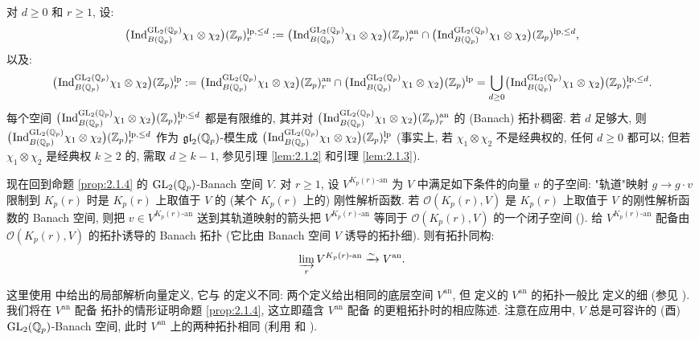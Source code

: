 对 $d \ge 0$ 和 $r \ge 1$, 设:
\[
\bigl(\prescript{}{}{\mathrm{Ind}}_{B(\mathbb{Q}_p)}^{\mathrm{GL}_2(\mathbb{Q}_p)} \chi_1 \otimes \chi_2\bigr)(\mathbb{Z}_p)^{\mathrm{lp},\le d}_{r}
:= \bigl(\prescript{}{}{\mathrm{Ind}}_{B(\mathbb{Q}_p)}^{\mathrm{GL}_2(\mathbb{Q}_p)} \chi_1 \otimes \chi_2\bigr)(\mathbb{Z}_p)^{\mathrm{an}}_{r}
\cap \bigl(\prescript{}{}{\mathrm{Ind}}_{B(\mathbb{Q}_p)}^{\mathrm{GL}_2(\mathbb{Q}_p)} \chi_1 \otimes \chi_2\bigr)(\mathbb{Z}_p)^{\mathrm{lp},\le d},
\]
以及:
\[
\bigl(\prescript{}{}{\mathrm{Ind}}_{B(\mathbb{Q}_p)}^{\mathrm{GL}_2(\mathbb{Q}_p)} \chi_1 \otimes \chi_2\bigr)(\mathbb{Z}_p)^{\mathrm{lp}}_{r}
:= \bigl(\prescript{}{}{\mathrm{Ind}}_{B(\mathbb{Q}_p)}^{\mathrm{GL}_2(\mathbb{Q}_p)} \chi_1 \otimes \chi_2\bigr)(\mathbb{Z}_p)^{\mathrm{an}}_{r}
\cap \bigl(\prescript{}{}{\mathrm{Ind}}_{B(\mathbb{Q}_p)}^{\mathrm{GL}_2(\mathbb{Q}_p)} \chi_1 \otimes \chi_2\bigr)(\mathbb{Z}_p)^{\mathrm{lp}}
= \bigcup_{d \ge 0} \bigl(\prescript{}{}{\mathrm{Ind}}_{B(\mathbb{Q}_p)}^{\mathrm{GL}_2(\mathbb{Q}_p)} \chi_1 \otimes \chi_2\bigr)(\mathbb{Z}_p)^{\mathrm{lp},\le d}_{r}.
\]
每个空间 $\bigl(\prescript{}{}{\mathrm{Ind}}_{B(\mathbb{Q}_p)}^{\mathrm{GL}_2(\mathbb{Q}_p)} \chi_1 \otimes \chi_2\bigr)(\mathbb{Z}_p)^{\mathrm{lp},\le d}_{r}$ 都是有限维的, 其并对 $\bigl(\prescript{}{}{\mathrm{Ind}}_{B(\mathbb{Q}_p)}^{\mathrm{GL}_2(\mathbb{Q}_p)} \chi_1 \otimes \chi_2\bigr)(\mathbb{Z}_p)^{\mathrm{an}}_{r}$ 的 (Banach) 拓扑稠密.
若 $d$ 足够大, 则 $\bigl(\prescript{}{}{\mathrm{Ind}}_{B(\mathbb{Q}_p)}^{\mathrm{GL}_2(\mathbb{Q}_p)} \chi_1 \otimes \chi_2\bigr)(\mathbb{Z}_p)^{\mathrm{lp},\le d}_{r}$ 作为 $\mathfrak{gl}_2(\mathbb{Q}_p)$-模生成 $\bigl(\prescript{}{}{\mathrm{Ind}}_{B(\mathbb{Q}_p)}^{\mathrm{GL}_2(\mathbb{Q}_p)} \chi_1 \otimes \chi_2\bigr)(\mathbb{Z}_p)^{\mathrm{lp}}_{r}$ (事实上, 若 $\chi_1 \otimes \chi_2$ 不是经典权的, 任何 $d \ge 0$ 都可以; 但若 $\chi_1 \otimes \chi_2$ 是经典权 $k \ge 2$ 的, 需取 $d \ge k-1$, 参见引理 \ref{lem:2.1.2} 和引理 \ref{lem:2.1.3}).

现在回到命题 \ref{prop:2.1.4} 的 $\mathrm{GL}_2(\mathbb{Q}_p)$-Banach 空间 $V$.
对 $r \ge 1$, 设 $V^{K_p(r)\text{-an}}$ 为 $V$ 中满足如下条件的向量 $v$ 的子空间: "轨道"映射 $g \to g \cdot v$ 限制到 $K_p(r)$ 时是 $K_p(r)$ 上取值于 $V$ 的 (某个 $K_p(r)$ 上的) 刚性解析函数.
若 $\mathcal{O}(K_p(r),V)$ 是 $K_p(r)$ 上取值于 $V$ 的刚性解析函数的 Banach 空间, 则把 $v \in V^{K_p(r)\text{-an}}$ 送到其轨道映射的箭头把 $V^{K_p(r)\text{-an}}$ 等同于 $\mathcal{O}(K_p(r),V)$ 的一个闭子空间 (\cite[Prop.~3.3.3]{ref:26}).
给 $V^{K_p(r)\text{-an}}$ 配备由 $\mathcal{O}(K_p(r),V)$ 的拓扑诱导的 Banach 拓扑 (它比由 Banach 空间 $V$ 诱导的拓扑细).
则有拓扑同构:
\[
\varinjlim_r V^{K_p(r)\text{-an}} \xrightarrow{\sim} V^{\mathrm{an}}.
\]

\begin{remark}\label{rem:A.1.1}
这里使用 \cite[Def.~3.5.3]{ref:26} 中给出的局部解析向量定义, 它与 \cite{ref:45} 的定义不同: 两个定义给出相同的底层空间 $V^{\mathrm{an}}$, 但 \cite{ref:26} 定义的 $V^{\mathrm{an}}$ 的拓扑一般比 \cite{ref:45} 定义的细 (参见 \cite[Th.~3.5.7]{ref:26}).
我们将在 $V^{\mathrm{an}}$ 配备 \cite{ref:26} 拓扑的情形证明命题 \ref{prop:2.1.4}, 这立即蕴含 $V^{\mathrm{an}}$ 配备 \cite{ref:45} 的更粗拓扑时的相应陈述.
注意在应用中, $V$ 总是可容许的 (酉) $\mathrm{GL}_2(\mathbb{Q}_p)$-Banach 空间, 此时 $V^{\mathrm{an}}$ 上的两种拓扑相同 (利用 \cite[Prop.~6.2.4]{ref:26} 和 \cite[Th.~7.1]{ref:45}).
\end{remark}

